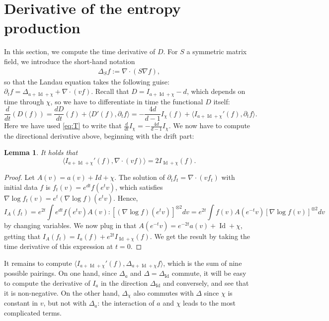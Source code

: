 \documentclass[11pt,a4paper]{article}
\theoremstyle{definition}
\theoremstyle{plain}
\newtheorem{lemma}[defi]{Lemma}
\DeclareMathOperator*{\Id}{Id}
\newcommand{\jap}[1]{\langle #1 \rangle}
\begin{document}
\section{Derivative of the entropy production}
\label{sec:A formula for the derivative of the entropy production}
In this section, we compute the time derivative of $D$. For $S$ a symmetric matrix field, we introduce the short-hand notation 
\begin{align*}
    \Delta_Sf:=\nabla\cdot(S\nabla f),
\end{align*}
so that the Landau equation takes the following guise: $\partial_t f = \Delta_{a+\Id+\chi}+\nabla\cdot(vf)$. Recall that $D=I_{a+\Id +\chi}-d$, which depends on time through $\chi$, so we have to differentiate in time the functional $D$ itself:
\begin{equation}
    \label{eq:derivD0}
    \frac{d}{dt}(D(f))=\frac{dD}{dt}(f) + \jap{D'(f),\partial_t f}=-\frac{4d}{d-1}I_\chi(f) + \jap{I_{a+\Id+\chi}'(f),\partial_t f}.
\end{equation}
Here we have used \eqref{eq:T} to write that $\frac{d}{dt}I_\chi= -\frac{4d}{d-1}I_\chi$. We now have to compute the directional derivative above, beginning with the drift part:
\begin{lemma} 
\label{lem:drift}
It holds that
$$ \jap{I_{a+\Id +\chi}'(f),\nabla\cdot(vf)}= 2I_{\Id + \chi}(f).$$
\end{lemma}
\begin{proof}
    Let $A(v)=a(v)+Id+\chi$. The solution of $\partial_t f_t = \nabla\cdot(vf_t)$ with initial data $f$ is $f_t(v) = e^{dt}f(e^tv)$, which satisfies
    $\nabla \log f_t (v)= e^t(\nabla \log f) (e^t v)$. Hence, $$I_{A}(f_t)= e^{2t}\int e^{dt} f(e^{t} v)A(v): \left[(\nabla \log f)(e^{t}v)\right]^{\otimes 2} dv =e^{2t}\int  f( v)A(e^{-t}v) \left[\nabla \log f (v)\right]^{\otimes 2} dv$$
    by changing variables. We now plug in that $A(e^{-t}v)=e^{-2t}a(v)+\Id+\chi$, getting that $I_A(f_t)=I_a(f)+e^{2t}I_{\Id +\chi}(f)$. We get the result by taking the time derivative of this expression at $t=0$.
\end{proof}

It remains to compute $\jap{I_{a+\Id+\chi}'(f),\Delta_{a+\Id+\chi} f}$, which is the sum of nine possible pairings. On one hand, since $\Delta_a$ and $\Delta=\Delta_{\Id}$ commute, it will be easy to compute the derivative of $I_{a}$ in the direction $\Delta_{\Id}$ and conversely, and see that it is non-negative. On the other hand, $\Delta_\chi$ also commutes with $\Delta$ since $\chi$ is constant in $v$, but not with $\Delta_a$: the interaction of $a$ and $\chi$ leads to the most complicated terms.
\end{document}
